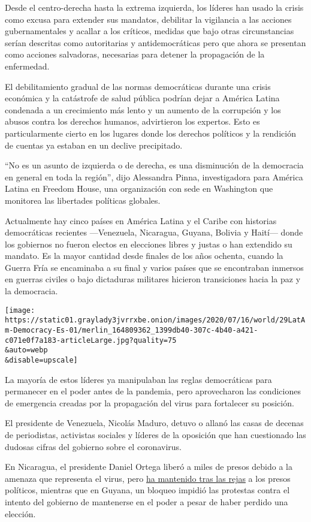 Desde el centro-derecha hasta la extrema izquierda, los líderes han
usado la crisis como excusa para extender sus mandatos, debilitar la
vigilancia a las acciones gubernamentales y acallar a los críticos,
medidas que bajo otras circunstancias serían descritas como autoritarias
y antidemocráticas pero que ahora se presentan como acciones salvadoras,
necesarias para detener la propagación de la enfermedad.

El debilitamiento gradual de las normas democráticas durante una crisis
económica y la catástrofe de salud pública podrían dejar a América
Latina condenada a un crecimiento más lento y un aumento de la
corrupción y los abusos contra los derechos humanos, advirtieron los
expertos. Esto es particularmente cierto en los lugares donde los
derechos políticos y la rendición de cuentas ya estaban en un declive
precipitado.

``No es un asunto de izquierda o de derecha, es una disminución de la
democracia en general en toda la región'', dijo Alessandra Pinna,
investigadora para América Latina en Freedom House, una organización con
sede en Washington que monitorea las libertades políticas globales.

Actualmente hay cinco países en América Latina y el Caribe con historias
democráticas recientes ---Venezuela, Nicaragua, Guyana, Bolivia y
Haití--- donde los gobiernos no fueron electos en elecciones libres y
justas o han extendido su mandato. Es la mayor cantidad desde finales de
los años ochenta, cuando la Guerra Fría se encaminaba a su final y
varios países que se encontraban inmersos en guerras civiles o bajo
dictaduras militares hicieron transiciones hacia la paz y la democracia.

\texttt{[image: https://static01.graylady3jvrrxbe.onion/images/2020/07/16/world/29LatAm-Democracy-Es-01/merlin\_164809362\_1399db40-307c-4b40-a421-c071e0f7a183-articleLarge.jpg?quality=75\\\&auto=webp\\\&disable=upscale]}

La mayoría de estos líderes ya manipulaban las reglas democráticas para
permanecer en el poder antes de la pandemia, pero aprovecharon las
condiciones de emergencia creadas por la propagación del virus para
fortalecer su posición.

El presidente de Venezuela, Nicolás Maduro, detuvo o allanó las casas de
decenas de periodistas, activistas sociales y líderes de la oposición
que han cuestionado las dudosas cifras del gobierno sobre el
coronavirus.

En Nicaragua, el presidente Daniel Ortega liberó a miles de presos
debido a la amenaza que representa el virus, pero
\href{https://www.barrons.com/news/nicaragua-excludes-political-prisoners-from-mass-release-01586430304}{ha
mantenido tras las rejas} a los presos políticos, mientras que en
Guyana, un bloqueo impidió las protestas contra el intento del gobierno
de mantenerse en el poder a pesar de haber perdido una elección.

